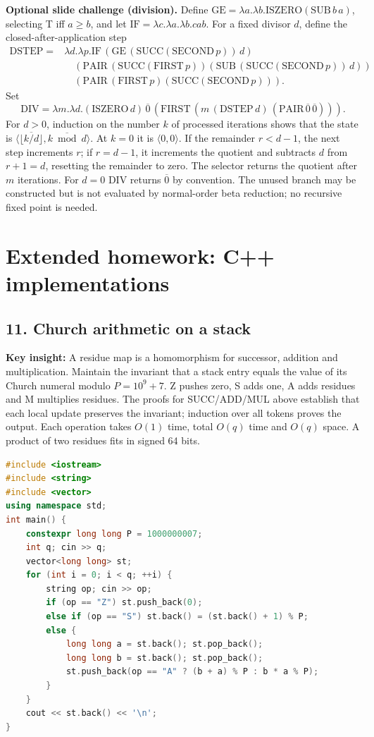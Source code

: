\documentclass[11pt]{article}
\newcommand{\insight}[1]{\par\medskip\noindent\textbf{Key insight:} #1}
\begin{document}
\textbf{Optional slide challenge (division).} Define $\mathrm{GE}=\lambda a.\lambda b.\mathrm{ISZERO}(\mathrm{SUB}\,b\,a)$, selecting T iff $a\ge b$, and let $\mathrm{IF}=\lambda c.\lambda a.\lambda b.cab$. For a fixed divisor $d$, define the closed-after-application step
\[\begin{aligned}
  \mathrm{DSTEP}={}&\lambda d.\lambda p.
    \mathrm{IF}\,(\mathrm{GE}\,(\mathrm{SUCC}(\mathrm{SECOND}\,p))\,d)\\
  &\quad(\mathrm{PAIR}\,(\mathrm{SUCC}(\mathrm{FIRST}\,p))
                 (\mathrm{SUB}\,(\mathrm{SUCC}(\mathrm{SECOND}\,p))\,d))\\
  &\quad(\mathrm{PAIR}\,(\mathrm{FIRST}\,p)
                 (\mathrm{SUCC}(\mathrm{SECOND}\,p))).
\end{aligned}\]
Set
\[\mathrm{DIV}=\lambda m.\lambda d.
    (\mathrm{ISZERO}\,d)\,\overline0\,
    (\mathrm{FIRST}\,(m\,(\mathrm{DSTEP}\,d)\,(\mathrm{PAIR}\,\overline0\,\overline0))).\]
For $d>0$, induction on the number $k$ of processed iterations shows that the state is $\langle\overline{\lfloor k/d\rfloor},\overline{k\bmod d}\rangle$. At $k=0$ it is $\langle0,0\rangle$. If the remainder $r<d-1$, the next step increments $r$; if $r=d-1$, it increments the quotient and subtracts $d$ from $r+1=d$, resetting the remainder to zero. The selector returns the quotient after $m$ iterations. For $d=0$ DIV returns $\overline0$ by convention. The unused branch may be constructed but is not evaluated by normal-order beta reduction; no recursive fixed point is needed.

\section{Extended homework: C++ implementations}

\subsection*{11. Church arithmetic on a stack}
\insight{A residue map is a homomorphism for successor, addition and multiplication.}
Maintain the invariant that a stack entry equals the value of its Church numeral modulo $P=10^9+7$. Z pushes zero, S adds one, A adds residues and M multiplies residues. The proofs for SUCC/ADD/MUL above establish that each local update preserves the invariant; induction over all tokens proves the output. Each operation takes $O(1)$ time, total $O(q)$ time and $O(q)$ space. A product of two residues fits in signed 64 bits.
\begin{lstlisting}[language=C++]
#include <iostream>
#include <string>
#include <vector>
using namespace std;
int main() {
    constexpr long long P = 1000000007;
    int q; cin >> q;
    vector<long long> st;
    for (int i = 0; i < q; ++i) {
        string op; cin >> op;
        if (op == "Z") st.push_back(0);
        else if (op == "S") st.back() = (st.back() + 1) % P;
        else {
            long long a = st.back(); st.pop_back();
            long long b = st.back(); st.pop_back();
            st.push_back(op == "A" ? (b + a) % P : b * a % P);
        }
    }
    cout << st.back() << '\n';
}
\end{lstlisting}
\end{document}
